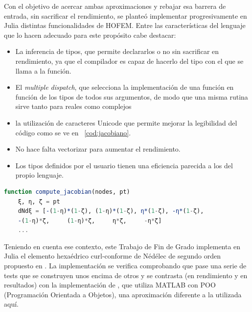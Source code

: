 \documentclass[12pt]{report} %
\begin{document}
Con el objetivo de acercar ambas aproximaciones y rebajar esa barrera de
entrada, sin sacrificar el rendimiento, se planteó implementar
progresivamente en Julia distintas funcionalidades de HOFEM. Entre las
características del lenguaje que lo hacen adecuado para este propósito
\cite{bezanson2017julia} cabe destacar:

\begin{itemize}
	\item La inferencia de tipos, que permite declararlos o no sin sacrificar 
	en rendimiento, ya que el compilador es capaz de hacerlo del tipo con el que se llama a la función.
	\item El \emph{multiple dispatch}, que selecciona la implementación de una
	función en función de los tipos de todos sus argumentos, de modo que una
	misma rutina sirve tanto para reales como complejos
	\item la utilización de caracteres Unicode que permite mejorar la legibilidad del código como se ve en ~\ref{cod:jacobiano}.
	\item No hace falta vectorizar para aumentar el rendimiento.
	\item Los tipos definidos por el usuario tienen una eficiencia parecida a los del propio lenguaje.
\end{itemize}
\begin{lstlisting}[language=Julia, caption={Construcción de la matriz jacobiana del mapeo isoparamétrico.}, label=cod:jacobiano]
	function compute_jacobian(nodes, pt)
	ξ, η, ζ = pt
	dNdξ = [-(1-η)*(1-ζ), (1-η)*(1-ζ), η*(1-ζ), -η*(1-ζ),
	-(1-η)*ζ,     (1-η)*ζ,     η*ζ,     -η*ζ]
	...
\end{lstlisting}

Teniendo en cuenta ese contexto, este Trabajo de Fin de Grado implementa en Julia el elemento hexaédrico curl-conforme de N\'ed\'elec de segundo orden propuesto en \cite{amor2023hexahedral}. La implementación se verifica comprobando que pase una serie de tests que se construyen unos encima de otros y se contrasta (en rendimiento y en resultados) con la implementación de \cite{amor2022zenodo}, que utiliza MATLAB con POO (Programación Orientada a Objetos), una aproximación diferente a la utilizada aquí.
\end{document}
